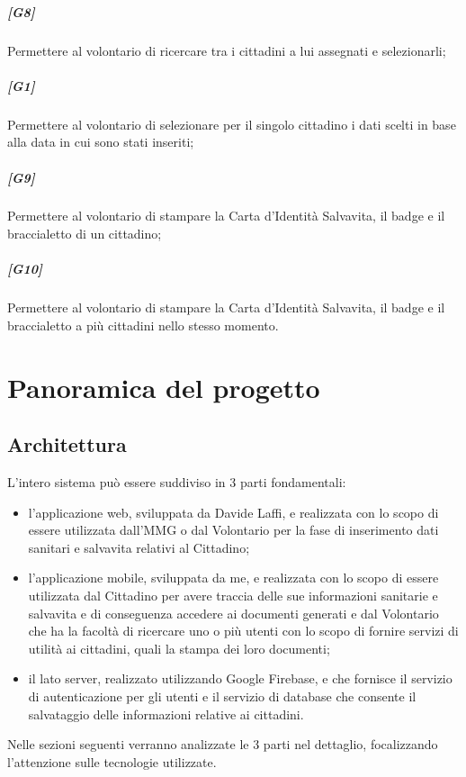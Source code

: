 \documentclass[12pt,a4paper,twoside,openright,titlepage]{book}
\begin{document}
\paragraph{[G8]} Permettere al volontario di ricercare tra i cittadini a lui assegnati e selezionarli;
\paragraph{[G1]} Permettere al volontario di selezionare per il singolo cittadino i dati scelti in base alla data in cui sono stati inseriti;
\paragraph{[G9]} Permettere al volontario di stampare la Carta d'Identità Salvavita, il badge e il braccialetto di un cittadino;
\paragraph{[G10]} Permettere al volontario di stampare la Carta d'Identità Salvavita, il badge e il braccialetto a più cittadini nello stesso momento.


\chapter{Panoramica del progetto}

\section{Architettura}
L'intero sistema può essere suddiviso in 3 parti fondamentali:
\begin{itemize}
\item l'applicazione web, sviluppata da Davide Laffi, e realizzata con lo scopo di essere utilizzata dall'MMG o dal Volontario per la fase di inserimento dati sanitari e salvavita relativi al Cittadino;
\item l'applicazione mobile, sviluppata da me, e realizzata con lo scopo di essere utilizzata dal Cittadino per avere traccia delle sue informazioni sanitarie e salvavita e di conseguenza accedere ai documenti generati e dal Volontario che ha la facoltà di ricercare uno o più utenti con lo scopo di fornire servizi di utilità ai cittadini, quali la stampa dei loro documenti;
\item il lato server, realizzato utilizzando Google Firebase, e che fornisce il servizio di autenticazione per gli utenti e il servizio di database che consente il salvataggio delle informazioni relative ai cittadini.
\end{itemize}
Nelle sezioni seguenti verranno analizzate le 3 parti nel dettaglio, focalizzando l'attenzione sulle tecnologie utilizzate.\newline
\end{document}
